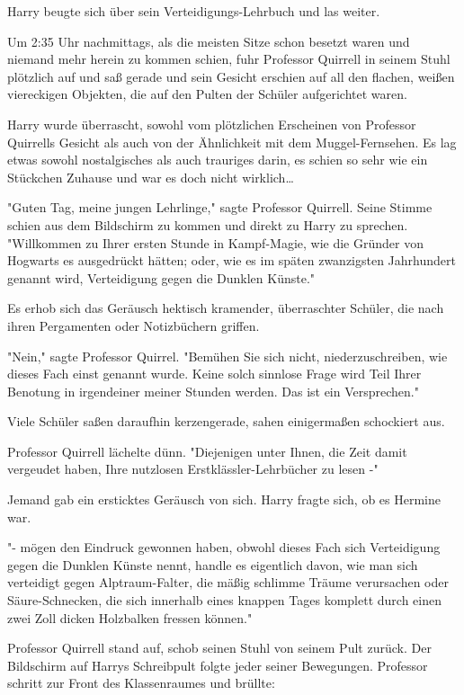 {Harry beugte sich über sein Verteidigungs-Lehrbuch und las weiter.

\later

Um 2:35 Uhr nachmittags, als die meisten Sitze schon besetzt waren und niemand mehr herein zu kommen schien, fuhr Professor Quirrell in seinem Stuhl plötzlich auf und saß gerade und sein Gesicht erschien auf all den flachen, weißen viereckigen Objekten, die auf den Pulten der Schüler aufgerichtet waren.

Harry wurde überrascht, sowohl vom plötzlichen Erscheinen von Professor Quirrells Gesicht als auch von der Ähnlichkeit mit dem Muggel-Fernsehen. Es lag etwas sowohl nostalgisches als auch trauriges darin, es schien so sehr wie ein Stückchen Zuhause und war es doch nicht wirklich…

"Guten Tag, meine jungen Lehrlinge," sagte Professor Quirrell. Seine Stimme schien aus dem Bildschirm zu kommen und direkt zu Harry zu sprechen. "Willkommen zu Ihrer ersten Stunde in Kampf-Magie, wie die Gründer von Hogwarts es ausgedrückt hätten; oder, wie es im späten zwanzigsten Jahrhundert genannt wird, Verteidigung gegen die Dunklen Künste."

Es erhob sich das Geräusch hektisch kramender, überraschter Schüler, die nach ihren Pergamenten oder Notizbüchern griffen.

"Nein," sagte Professor Quirrel. "Bemühen Sie sich nicht, niederzuschreiben, wie dieses Fach einst genannt wurde. Keine solch sinnlose Frage wird Teil Ihrer Benotung in irgendeiner meiner Stunden werden. Das ist ein Versprechen."

Viele Schüler saßen daraufhin kerzengerade, sahen einigermaßen schockiert aus.

Professor Quirrell lächelte dünn. "Diejenigen unter Ihnen, die Zeit damit vergeudet haben, Ihre nutzlosen Erstklässler-Lehrbücher zu lesen -"

Jemand gab ein ersticktes Geräusch von sich. Harry fragte sich, ob es Hermine war.

"- mögen den Eindruck gewonnen haben, obwohl dieses Fach sich Verteidigung gegen die Dunklen Künste nennt, handle es eigentlich davon, wie man sich verteidigt gegen Alptraum-Falter, die mäßig schlimme Träume verursachen oder Säure-Schnecken, die sich innerhalb eines knappen Tages komplett durch einen zwei Zoll dicken Holzbalken fressen können."

Professor Quirrell stand auf, schob seinen Stuhl von seinem Pult zurück. Der Bildschirm auf Harrys Schreibpult folgte jeder seiner Bewegungen. Professor schritt zur Front des Klassenraumes und brüllte:

}

